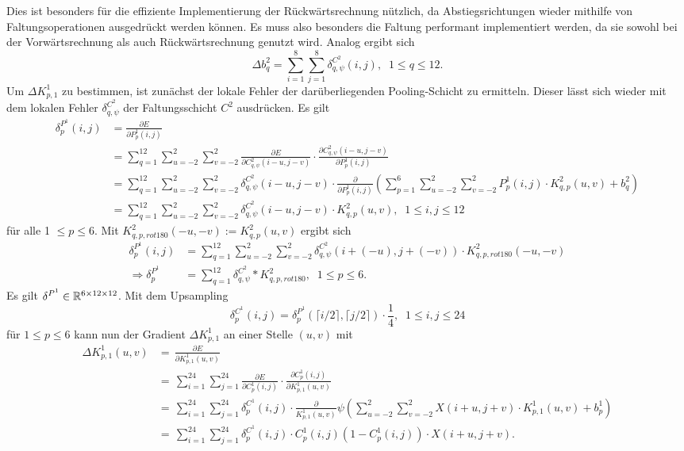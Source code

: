 Dies ist besonders für die effiziente Implementierung der Rückwärtsrechnung nützlich, da Abstiegsrichtungen wieder mithilfe von Faltungsoperationen ausgedrückt werden können. Es muss also besonders die Faltung performant implementiert werden, da sie sowohl bei der Vorwärtsrechnung als auch Rückwärtsrechnung genutzt wird. Analog ergibt sich 
\begin{equation*}
    \Delta b_q^2=  \sum_{i=1}^8 \sum_{j=1}^8 \delta_{q,\psi}^{C^2}(i,j), \; \; 1 \leq q \leq 12.
\end{equation*}
Um $ \Delta K^1_{p,1}$ zu bestimmen, ist zunächst der lokale Fehler der darüberliegenden Pooling-Schicht zu ermitteln. Dieser lässt sich wieder mit dem lokalen Fehler $\delta_{q,\psi}^{C^2}$ der Faltungsschicht $C^2$ ausdrücken. Es gilt 
\begin{align*}
    \delta^{P^1}_{p}(i,j) &= \frac{\partial E}{\partial P^1_{p}(i,j)} \\
    &= \sum_{q=1}^{12} \sum_{u=-2}^2 \sum_{v=-2}^2 \frac{\partial E}{\partial C^2_{q,\psi}(i-u,j-v)} \cdot \frac{\partial C^2_{q,\psi}(i-u,j-v)}{\partial P_{p}^1(i,j)} \\
    &= \sum_{q=1}^{12} \sum_{u=-2}^2 \sum_{v=-2}^2 \delta^{C^2}_{q,\psi}(i-u,j-v) \cdot \frac{\partial}{\partial P_p^1(i,j)} \left( \sum_{p=1}^6 \sum_{u=-2}^2 \sum_{v=-2}^2 P^1_p(i,j) \cdot K^2_{q,p}(u,v) +b_q^2\right) \\
    &= \sum_{q=1}^{12} \sum_{u=-2}^2 \sum_{v=-2}^2 \delta_{q,\psi}^{C^2}(i-u,j-v) \cdot K^2_{q,p}(u,v), \; \; 1 \leq i,j \leq 12
\end{align*}
für alle 1 $\leq p \leq 6$. Mit $K^2_{q,p,rot180}(-u,-v):=K^2_{q,p}(u,v)$ ergibt sich
\begin{align*}
    \delta^{P^1}_{p}(i,j)&=\sum_{q=1}^{12} \sum_{u=-2}^2 \sum_{v=-2}^2 \delta_{q,\psi}^{C^2}(i+(-u),j+(-v)) \cdot K^2_{q,p,rot180}(-u,-v) \\
    \Rightarrow \delta^{P^1}_{p} &= \sum_{q=1}^{12} \delta_{q, \psi}^{C^2} \ast K_{q,p,rot180}^2, \; \; 1 \leq p \leq 6.
    \end{align*}
Es gilt  $\delta^{P^1} \in \mathbb{R}^{6 \times 12 \times 12}$. Mit dem Upsampling
\begin{equation*}
    \delta^{C^1}_p(i,j)= \delta^{P^1}_p \left( \lceil i/2 \rceil, \lceil j/2 \rceil \right) \cdot \frac{1}{4}, \; \; 1 \leq i,j \leq 24 
\end{equation*}
für $1 \leq p \leq 6$ kann nun der Gradient $\Delta K^1_{p,1}$ an einer Stelle $(u,v)$ mit
\begin{align*}
    \Delta K^1_{p,1}(u,v) &= \, \frac{\partial E}{\partial K^1_{p,1}(u,v)} \\
    &= \, \sum_{i=1}^{24} \sum_{j=1}^{24} \frac{\partial E}{\partial C^1_p(i,j)} \cdot \frac{\partial C^1_p(i,j)}{\partial K_{p,1}^1(u,v)} \\
    &=  \, \sum_{i=1}^{24} \sum_{j=1}^{24} \delta_p^{C^1}(i,j) \cdot \frac{\partial}{ K^1_{p,1}(u,v)} \psi \left(\sum_{u=-2}^2 \sum_{v=-2}^2 X(i+u,j+v) \cdot K^1_{p,1}(u,v) +b_p^1\right) \\
    &=  \, \sum_{i=1}^{24} \sum_{j=1}^{24} \delta_p^{C^1}(i,j) \cdot C_p^1(i,j)\left(1-C_p^1(i,j)\right) \cdot X(i+u,j+v).
\end{align*}
